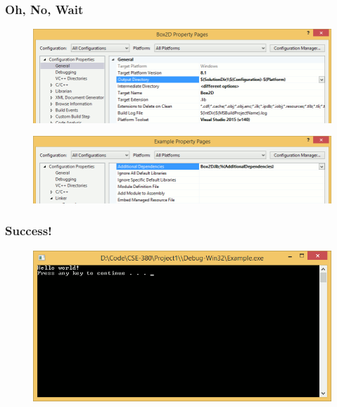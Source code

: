 \documentclass[glossy]{beamer}
\begin{document}

\begin{frame}[fragile=singleslide]
  \frametitle{Oh, No, Wait}

  \begin{figure}
    \centering
    \includegraphics[width=\columnwidth]{windows-11}
  \end{figure}

  \begin{figure}
    \centering
    \includegraphics[width=\columnwidth]{windows-12}
  \end{figure}
\end{frame}


\begin{frame}[fragile=singleslide]
  \frametitle{Success!}

  \begin{figure}
    \centering
    \includegraphics[width=\columnwidth]{windows-hello}
  \end{figure}
\end{frame}
\end{document}
